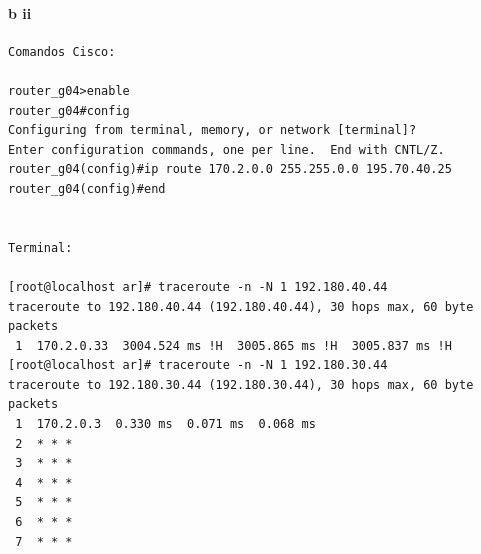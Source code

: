 \paragraph{b ii}
\begin{verbatim}
Comandos Cisco:                                                          
                                                                         
router_g04>enable                                                        
router_g04#config                                                        
Configuring from terminal, memory, or network [terminal]?                
Enter configuration commands, one per line.  End with CNTL/Z.            
router_g04(config)#ip route 170.2.0.0 255.255.0.0 195.70.40.25           
router_g04(config)#end                                                   
                                                                         
                                                                         
Terminal:                                                                
                                                                         
[root@localhost ar]# traceroute -n -N 1 192.180.40.44                    
traceroute to 192.180.40.44 (192.180.40.44), 30 hops max, 60 byte packets
 1  170.2.0.33  3004.524 ms !H  3005.865 ms !H  3005.837 ms !H           
[root@localhost ar]# traceroute -n -N 1 192.180.30.44                    
traceroute to 192.180.30.44 (192.180.30.44), 30 hops max, 60 byte packets
 1  170.2.0.3  0.330 ms  0.071 ms  0.068 ms                                                             
 2  * * *                                                                
 3  * * *                                                                
 4  * * *                                                                
 5  * * *                                                                
 6  * * *                                                                
 7  * * *                                                                
\end{verbatim}
